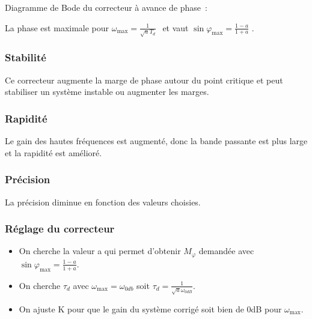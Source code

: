 Diagramme de Bode du correcteur à avance de phase~:

La phase est maximale pour \(\omega_{\max} = \frac{1}{\sqrt{a}T_{d}}\ \ \) et vaut \(\sin\varphi_{\max} = \frac{1 - a}{1 + a}\) .

\hypertarget{stabilituxe9-4}{%
\subsubsection*{Stabilité}\label{stabilituxe9-4}}

Ce correcteur augmente la marge de phase autour du point critique et peut stabiliser un système instable ou augmenter les marges.

\hypertarget{rapidituxe9-4}{%
\subsubsection*{Rapidité}\label{rapidituxe9-4}}

Le gain des hautes fréquences est augmenté, donc la bande passante est plus large et la rapidité est amélioré.

\hypertarget{pruxe9cision-4}{%
\subsubsection*{Précision}\label{pruxe9cision-4}}

La précision diminue en fonction des valeurs choisies.

\hypertarget{ruxe9glage-du-correcteur-2}{%
\subsubsection*{Réglage du correcteur}\label{ruxe9glage-du-correcteur-2}}

\begin{itemize}
\item
  On cherche la valeur a qui permet d'obtenir \(M_{\varphi}\) demandée avec \(\sin\varphi_{\max} = \frac{1 - a}{1 + a}\).
\item
  On cherche \(\tau_{d}\) avec \(\omega_{\max} = \omega_{0db}\) soit \(\tau_{d} = \frac{1}{\sqrt{a}\omega_{0dB}}\).
\item
  On ajuste K pour que le gain du système corrigé soit bien de 0dB pour \(\omega_{\max}\).
\end{itemize}

